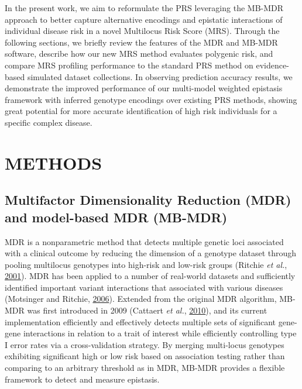 \documentclass[a4paper,twoside, 9pt]{article}
\begin{document}
In the present work, we aim to reformulate the PRS leveraging the MB-MDR
approach to better capture alternative encodings and epistatic
interactions of individual disease risk in a novel Multilocus Risk Score
(MRS). Through the following sections, we briefly review the features of
the MDR and MB-MDR software, describe how our new MRS method evaluates
polygenic risk, and compare MRS profiling performance to the standard
PRS method on evidence-based simulated dataset collections. In observing
prediction accuracy results, we demonstrate the improved performance of
our multi-model weighted epistasis framework with inferred genotype
encodings over existing PRS methods, showing great potential for more
accurate identification of high risk individuals for a specific complex
disease.

\section{\uppercase{Methods}}

\noindent \subsection{Multifactor Dimensionality Reduction (MDR) and
model-based MDR
(MB-MDR)}\label{multifactor-dimensionality-reduction-mdr-and-model-based-mdr-mb-mdr}
MDR is a nonparametric method that detects multiple genetic loci
associated with a clinical outcome by reducing the dimension of a
genotype dataset through pooling multilocus genotypes into high-risk and
low-risk groups (Ritchie \emph{et al.},
\protect\hyperlink{ref-E26QhGxD}{2001}).
MDR has been applied to a number of real-world datasets and sufficiently identified important variant interactions that associated with various diseases (Motsinger and Ritchie, \protect\hyperlink{ref-motsinger}{2006}).
Extended from the original MDR
algorithm, MB-MDR was first introduced in 2009 (Cattaert \emph{et al.},
\protect\hyperlink{ref-16AnEAMje}{2010}), and its current
implementation efficiently and effectively detects multiple sets of
significant gene-gene interactions in relation to a trait of interest
while efficiently controlling type I error rates via a cross-validation strategy.
By merging multi-locus genotypes exhibiting significant high or low risk based on association testing rather than comparing to an arbitrary threshold as in MDR, MB-MDR provides a flexible framework to detect and measure epistasis. 
\end{document}
